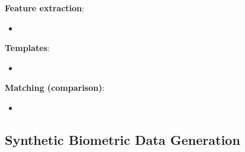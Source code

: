 \documentclass[a4paper]{article}
\begin{document}
      \textbf{Feature extraction}:
      \begin{itemize}
        \item 
      \end{itemize}

      \textbf{Templates}:
      \begin{itemize}
        \item 
      \end{itemize}

      \textbf{Matching (comparison)}:
      \begin{itemize}
        \item 
      \end{itemize}
  \subsection*{Synthetic Biometric Data Generation}
\end{document}
